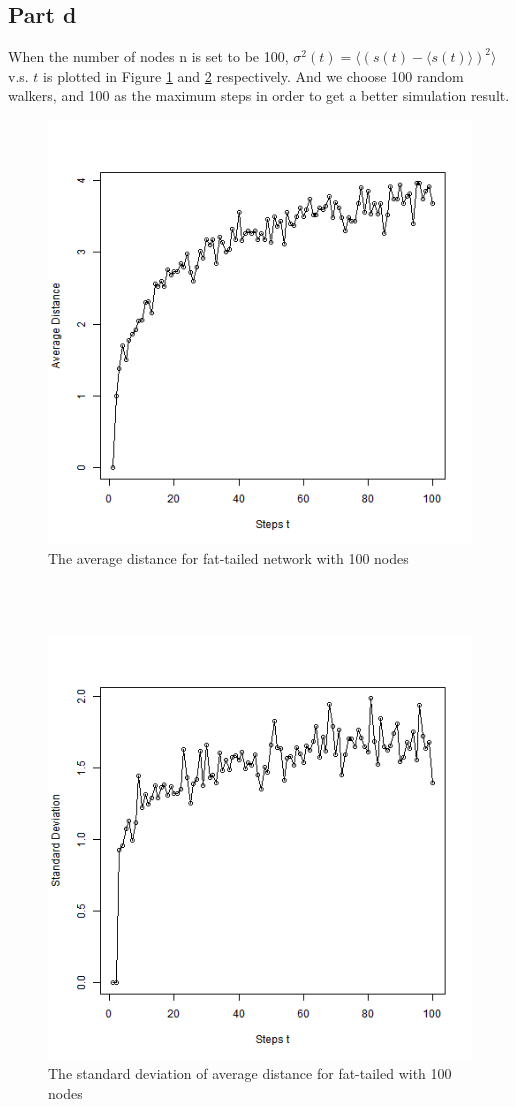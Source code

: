\documentclass{article}
\begin{document}
\subsection{Part d}
When the number of nodes n is set to be 100, $\sigma^2(t)=\langle (s(t)-\langle s(t)\rangle)^2\rangle$ v.s. $t$ is plotted in Figure \ref{fig:p2_d1} and \ref{fig:p2_d2} respectively. And we choose 100 random walkers, and 100 as the maximum steps in order to get a better simulation result.
\begin{figure}[htbp]
\centering
\includegraphics[width=.6\textwidth]{Q2d_1_100.png}
\caption{The average distance for fat-tailed network with 100 nodes}
\label{fig:p2_d1}
\end{figure}\\
\\
\begin{figure}[htbp]
\centering
\includegraphics[width=.6\textwidth]{Q2d_2_100.png}
\caption{The standard deviation of average distance for fat-tailed with 100 nodes}
\label{fig:p2_d2}
\end{figure}\\
\end{document}

